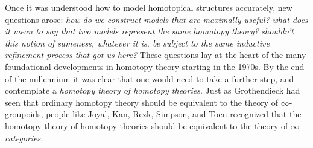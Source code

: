 Once it was understood how to model homotopical structures accurately, new questions arose:
\emph{how do we construct models that are maximally useful?}
\emph{what does it mean to say that two models represent the same homotopy theory?}
\emph{shouldn't this notion of sameness, whatever it is, be subject to the same inductive refinement process that got us here?}
These questions lay at the heart of the many foundational developments in homotopy theory starting in the 1970s.
By the end of the millennium it was clear that one would need to take a further step, and contemplate a \emph{homotopy theory of homotopy theories}.
Just as Grothendieck had seen that ordinary homotopy theory should be equivalent to the theory of $\infty$-groupoids,
people like Joyal, Kan, Rezk, Simpson, and Toen recognized that the homotopy theory of homotopy theories should be equivalent to the theory of \emph{$\infty$-categories}.


